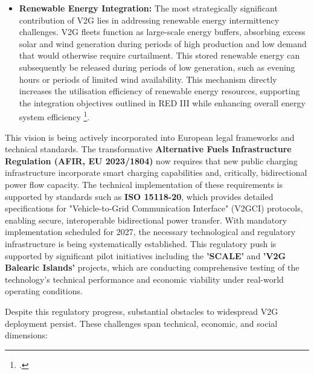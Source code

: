 \begin{itemize}
    \item \textbf{Renewable Energy Integration:} The most strategically significant contribution of V2G lies in addressing renewable energy intermittency challenges. V2G fleets function as large-scale energy buffers, absorbing excess solar and wind generation during periods of high production and low demand that would otherwise require curtailment. This stored renewable energy can subsequently be released during periods of low generation, such as evening hours or periods of limited wind availability. This mechanism directly increases the utilisation efficiency of renewable energy resources, supporting the integration objectives outlined in RED III while enhancing overall energy system efficiency \footcite{khan2024review, zou2021deep}.
\end{itemize}
\noindent
This vision is being actively incorporated into European legal frameworks and technical standards. The transformative \textbf{Alternative Fuels Infrastructure Regulation (AFIR, EU 2023/1804)} now requires that new public charging infrastructure incorporate smart charging capabilities and, critically, bidirectional power flow capacity. The technical implementation of these requirements is supported by standards such as \textbf{ISO 15118-20}, which provides detailed specifications for "Vehicle-to-Grid Communication Interface" (V2GCI) protocols, enabling secure, interoperable bidirectional power transfer. With mandatory implementation scheduled for 2027, the necessary technological and regulatory infrastructure is being systematically established. This regulatory push is supported by significant pilot initiatives including the \textbf{'SCALE'} and \textbf{'V2G Balearic Islands'} projects, which are conducting comprehensive testing of the technology's technical performance and economic viability under real-world operating conditions.

\noindent
Despite this regulatory progress, substantial obstacles to widespread V2G deployment persist. These challenges span technical, economic, and social dimensions:

